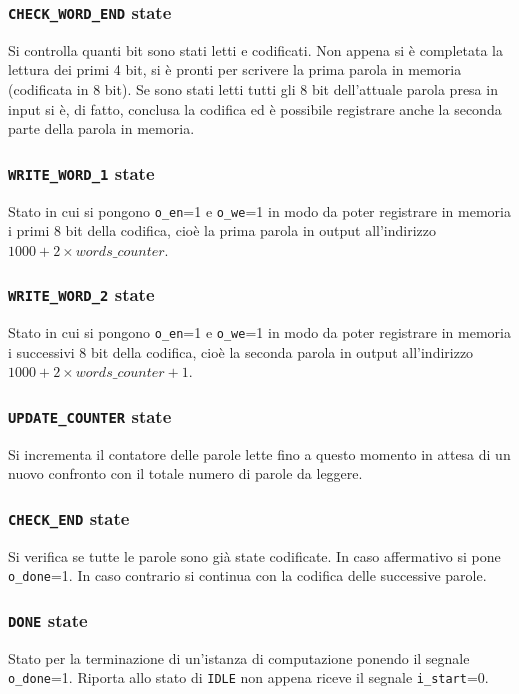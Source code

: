 \documentclass{article}
\begin{document}
\subsubsection{\texttt{CHECK\_WORD\_END} state}
Si controlla quanti bit sono stati letti e codificati. Non appena si è completata la lettura dei primi 4 bit, si è pronti per scrivere la prima parola in memoria (codificata in 8 bit). Se sono stati letti tutti gli 8 bit dell'attuale parola presa in input si è, di fatto, conclusa la codifica ed è possibile registrare anche la seconda parte della parola in memoria.

\subsubsection{\texttt{WRITE\_WORD\_1} state}
Stato in cui si pongono \verb|o_en|=1 e \verb|o_we|=1 in modo da poter registrare in memoria i primi 8 bit della codifica, cioè la prima parola in output all'indirizzo $1000 + 2 \times words\_counter$.

\subsubsection{\texttt{WRITE\_WORD\_2} state}
Stato in cui si pongono \verb|o_en|=1 e \verb|o_we|=1 in modo da poter registrare in memoria i successivi 8 bit della codifica, cioè la seconda parola in output all'indirizzo $1000 + 2 \times words\_counter + 1$.

\subsubsection{\texttt{UPDATE\_COUNTER} state}
Si incrementa il contatore delle parole lette fino a questo momento in attesa di un nuovo confronto con il totale numero di parole da leggere.

\subsubsection{\texttt{CHECK\_END} state}
Si verifica se tutte le parole sono già state codificate. In caso affermativo si pone \verb|o_done|=1. In caso contrario si continua con la codifica delle successive parole.

\subsubsection{\texttt{DONE} state}
Stato per la terminazione di un’istanza di computazione ponendo il segnale \verb|o_done|=1. Riporta allo stato di \verb|IDLE| non appena riceve il segnale \verb|i_start|=0.
\end{document}
